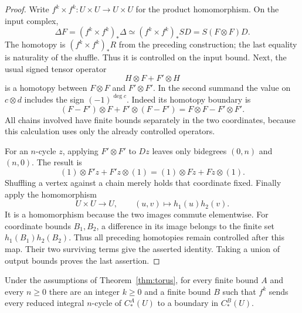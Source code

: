 \begin{proof}
Write $f^k\times f^k:U\times U\to U\times U$ for the product
homomorphism.  On the input complex,
\[
 \Delta F=(f^k\times f^k)_*\Delta
 \simeq (f^k\times f^k)_*SD=S(F\otimes F)D.
\]
The homotopy is $(f^k\times f^k)_*R$ from the preceding construction;
the last equality is naturality of the shuffle.  Thus it is controlled
on the input bound.  Next, the usual signed tensor operator
\[
 H\otimes F+F'\otimes H
\]
is a homotopy between $F\otimes F$ and $F'\otimes F'$.
In the second summand the value on $c\otimes d$ includes the sign
$(-1)^{\deg c}$.  Indeed its homotopy boundary is
\[
 (F-F')\otimes F+F'\otimes(F-F')
       =F\otimes F-F'\otimes F'.
\]
All chains involved have finite bounds separately in the two
coordinates, because this calculation uses only the already
controlled operators.

For an $n$-cycle $z$, applying $F'\otimes F'$ to $Dz$ leaves only
bidegrees $(0,n)$ and $(n,0)$.  The result is
\[
 (1)\otimes F'z+F'z\otimes(1)
     =(1)\otimes Fz+Fz\otimes(1).
\]
Shuffling a vertex against a chain merely holds that coordinate
fixed.  Finally apply the homomorphism
\[
 U\times U\longrightarrow U,
 \qquad (u,v)\longmapsto h_1(u)h_2(v).
\]
It is a homomorphism because the two images commute elementwise.
For coordinate bounds $B_1,B_2$, a difference in its image belongs
to the finite set $h_1(B_1)h_2(B_2)$.  Thus all preceding homotopies
remain controlled after this map.  Their two surviving terms give
the asserted identity.  Taking a union of output bounds proves the
last assertion.
\end{proof}

\begin{proposition}\label{prop:uniform-fillings}
Under the assumptions of Theorem~\ref{thm:torus}, for every finite
bound $A$ and every $n\ge0$ there are an integer $k\ge0$ and a finite
bound $B$ such that $f^k$ sends every reduced integral $n$-cycle of
$C_*^A(U)$ to a boundary in $C_*^B(U)$.
\end{proposition}

